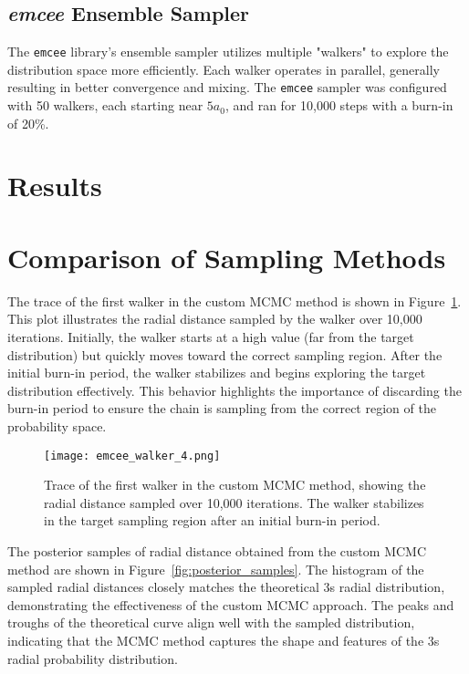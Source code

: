 \documentclass[twocolumn, 11pt]{article}
\begin{document}
\subsection{\textit{emcee} Ensemble Sampler}
The \texttt{emcee} library's ensemble sampler utilizes multiple "walkers" to explore the distribution space more efficiently. Each walker operates in parallel, generally resulting in better convergence and mixing. The \texttt{emcee} sampler was configured with 50 walkers, each starting near \( 5a_0 \), and ran for 10,000 steps with a burn-in of 20\%.

\section*{Results}

\section{Comparison of Sampling Methods}

The trace of the first walker in the custom MCMC method is shown in Figure~\ref{fig:walker_trace}. This plot illustrates the radial distance sampled by the walker over 10,000 iterations. Initially, the walker starts at a high value (far from the target distribution) but quickly moves toward the correct sampling region. After the initial burn-in period, the walker stabilizes and begins exploring the target distribution effectively. This behavior highlights the importance of discarding the burn-in period to ensure the chain is sampling from the correct region of the probability space.

\begin{figure}[h!]
    \centering
    \texttt{[image: emcee\_walker\_4.png]}
    \caption{Trace of the first walker in the custom MCMC method, showing the radial distance sampled over 10,000 iterations. The walker stabilizes in the target sampling region after an initial burn-in period.}
    \label{fig:walker_trace}
\end{figure}


The posterior samples of radial distance obtained from the custom MCMC method are shown in Figure~\ref{fig:posterior_samples}. The histogram of the sampled radial distances closely matches the theoretical 3s radial distribution, demonstrating the effectiveness of the custom MCMC approach. The peaks and troughs of the theoretical curve align well with the sampled distribution, indicating that the MCMC method captures the shape and features of the 3s radial probability distribution.
\end{document}
